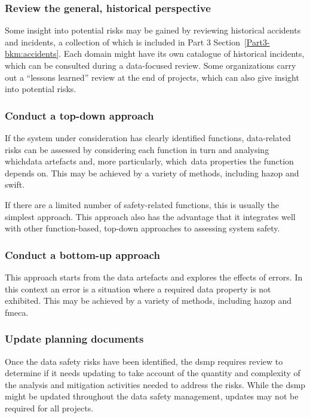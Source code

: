 \subsubsection{Review the general, historical perspective}
Some insight into potential risks may be gained by reviewing historical accidents and incidents, a collection of which is included in
Part 3 Section~\ref{Part3-bkm:accidents}. Each domain might have its own catalogue of historical incidents, which can be consulted during a data-focused review. Some organizations carry out a ``lessons learned'' review at the end of projects, which can also give insight into potential risks.

\subsubsection{Conduct a top-down approach}
If the system under consideration has clearly identified functions, data-related risks can be assessed by considering each function in turn and analysing \cbstart which\cbend{}\glspl{data artefact} and, more particularly, \cbstart which\cbend\ data properties the function depends on. This may be achieved by a variety of methods, including \gls{hazop} and \gls{swift}.

If there are a limited number of safety-related functions, this is usually the simplest approach. This approach also has the advantage that it integrates well with other function-based, top-down approaches to assessing system safety. 

\subsubsection{Conduct a bottom-up approach}
This approach starts from the \glspl{data artefact} and explores the effects of \glspl{error}. In this context an error is a situation where a required \gls{data property} is not exhibited. This may be achieved by a variety of methods, including \gls{hazop} and \gls{fmeca}.

\subsubsection{Update planning documents}
Once the data safety risks have been identified, the \gls{dsmp} requires review to determine if it needs
updating to take account of the quantity and complexity of the analysis and \gls{mitigation} activities needed to address the risks. While the \gls{dsmp} might be updated throughout the \cbstart data safety management\cbend, updates may not be required for all projects.

